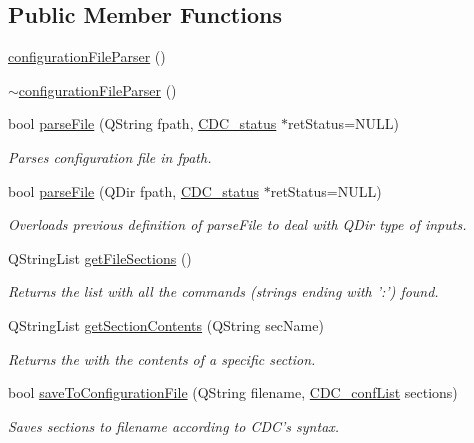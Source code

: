 \subsection*{Public Member Functions}
\begin{DoxyCompactItemize}
\item 
\hyperlink{classconfiguration_file_parser_a88e1b98b7623b2171754db03844b2f2e}{configuration\+File\+Parser} ()
\item 
\hyperlink{classconfiguration_file_parser_ad58b1489837edb4b93a6f9c8ce7c8205}{$\sim$configuration\+File\+Parser} ()
\item 
bool \hyperlink{classconfiguration_file_parser_a54096c6c98ac28b99fcf23da24fcec1d}{parse\+File} (Q\+String fpath, \hyperlink{cdcdefs_8h_a7a1ca742b5a041762c1b5784532bd7fd}{C\+D\+C\+\_\+status} $\ast$ret\+Status=N\+U\+L\+L)
\begin{DoxyCompactList}\small\item\em Parses configuration file in {\itshape fpath}. \end{DoxyCompactList}\item 
bool \hyperlink{classconfiguration_file_parser_aff72b19dd3fb860a9d0917cbb444a504}{parse\+File} (Q\+Dir fpath, \hyperlink{cdcdefs_8h_a7a1ca742b5a041762c1b5784532bd7fd}{C\+D\+C\+\_\+status} $\ast$ret\+Status=N\+U\+L\+L)
\begin{DoxyCompactList}\small\item\em Overloads previous definition of parse\+File to deal with {\itshape Q\+Dir} type of inputs. \end{DoxyCompactList}\item 
Q\+String\+List \hyperlink{classconfiguration_file_parser_a16112cdbdab9ee6ae509aab850697356}{get\+File\+Sections} ()
\begin{DoxyCompactList}\small\item\em Returns the list with all the commands (strings ending with '\+:') found. \end{DoxyCompactList}\item 
Q\+String\+List \hyperlink{classconfiguration_file_parser_a7ca368e0b88cc355f69f572b42763938}{get\+Section\+Contents} (Q\+String sec\+Name)
\begin{DoxyCompactList}\small\item\em Returns the with the contents of a specific section. \end{DoxyCompactList}\item 
bool \hyperlink{classconfiguration_file_parser_ad2e01512b0a5454c0e719982b30699f6}{save\+To\+Configuration\+File} (Q\+String filename, \hyperlink{cdcdefs_8h_adfd872d2c7ac9d9182576c76af28ea98}{C\+D\+C\+\_\+conf\+List} sections)
\begin{DoxyCompactList}\small\item\em Saves {\itshape sections} to {\itshape filename} according to C\+D\+C's syntax. \end{DoxyCompactList}\end{DoxyCompactItemize}
